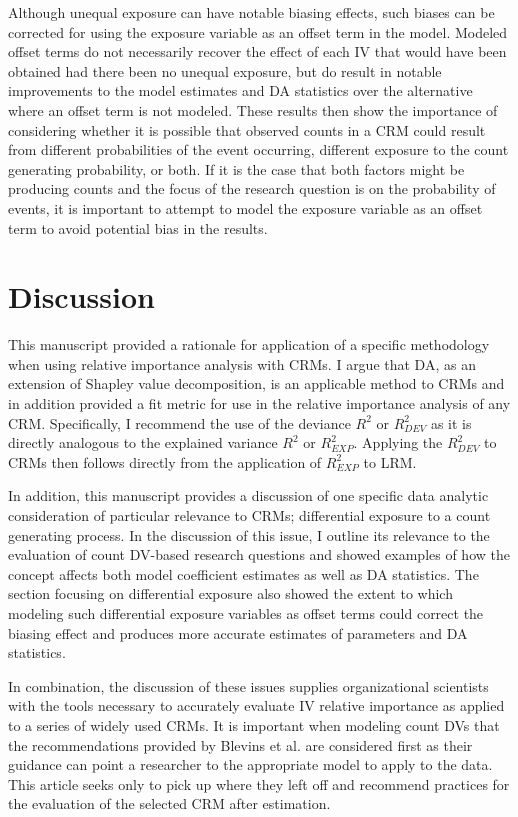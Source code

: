 \documentclass[ShortAfour,times,sageapa]{sagej}
\begin{document}
	Although unequal exposure can have notable biasing effects, such biases can be corrected for using the exposure variable as an offset term in the model.
	Modeled offset terms do not necessarily recover the effect of each IV that would have been obtained had there been no unequal exposure, but do result in notable improvements to the model estimates and DA statistics over the alternative where an offset term is not modeled. 
	These results then show the importance of considering whether it is possible that observed counts in a CRM could result from different probabilities of the event occurring, different exposure to the count generating probability, or both.
	If it is the case that both factors might be producing counts and the focus of the research question is on the probability of events, it is important to attempt to model the exposure variable as an offset term to avoid potential bias in the results.

	
\section{Discussion}

	This manuscript provided a rationale for application of a specific methodology when using relative importance analysis with CRMs.
	I argue that DA, as an extension of Shapley value decomposition, is an applicable method to CRMs and in addition provided a fit metric for use in the relative importance analysis of any CRM.
	Specifically, I recommend the use of the deviance $R^2$ or $R^2_{DEV}$ as it is directly analogous to the explained variance $R^2$ or $R^2_{EXP}$.
	Applying the $R^2_{DEV}$ to CRMs then follows directly from the application of $R^2_{EXP}$ to LRM.
	
	In addition, this manuscript provides a discussion of one specific data analytic consideration of particular relevance to CRMs; differential exposure to a count generating process.
	In the discussion of this issue, I outline its relevance to the evaluation of count DV-based research questions and showed examples of how the concept affects both model coefficient estimates as well as DA statistics.
	The section focusing on differential exposure also showed the extent to which modeling such differential exposure variables as offset terms could correct the biasing effect and produces more accurate estimates of parameters and DA statistics.
	
	In combination, the discussion of these issues supplies organizational scientists with the tools necessary to accurately evaluate IV relative importance as applied to a series of widely used CRMs. 
	It is important when modeling count DVs that the recommendations provided by Blevins et al. \citeyear{blevins2015count} are considered first as their guidance can point a researcher to the appropriate model to apply to the data. 
	This article seeks only to pick up where they left off and recommend practices for the evaluation of the selected CRM after estimation. 
	
\end{document}
